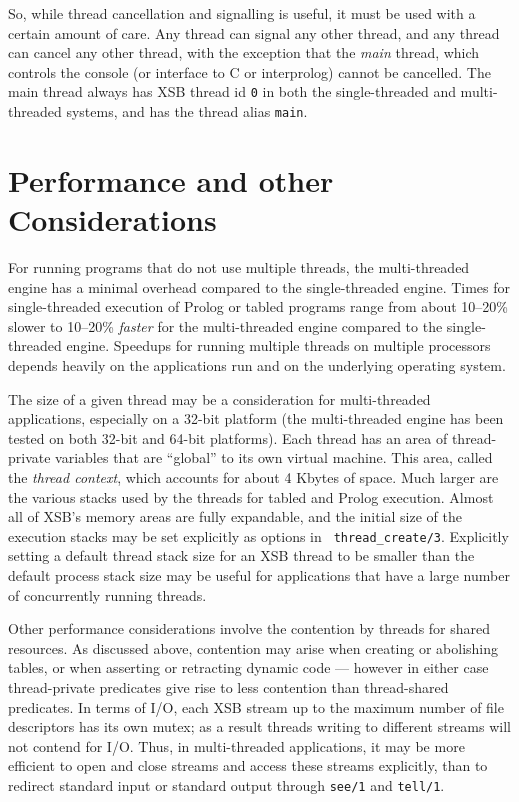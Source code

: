 So, while thread cancellation and signalling is useful, it must be
used with a certain amount of care.  Any thread can signal any other
thread, and any thread can cancel any other thread, with the exception
that the {\em main} thread, which controls the console (or interface
to C or interprolog) cannot be cancelled.  The main thread always has
XSB thread id {\tt 0} in both the single-threaded and multi-threaded
systems, and has the thread alias {\tt main}.

\section{Performance and other Considerations}
%
For running programs that do not use multiple threads, the
multi-threaded engine has a minimal overhead compared to the
single-threaded engine.  Times for single-threaded execution of Prolog
or tabled programs range from about 10--20\% slower to 10--20\% {\em
  faster} for the multi-threaded engine compared to the
single-threaded engine.  Speedups for running multiple threads on
multiple processors depends heavily on the applications run and on the
underlying operating system.

The size of a given thread may be a consideration for multi-threaded
applications, especially on a 32-bit platform (the multi-threaded
engine has been tested on both 32-bit and 64-bit platforms).  Each
thread has an area of thread-private variables that are ``global'' to
its own virtual machine.  This area, called the {\em thread context},
which accounts for about 4 Kbytes of space.  Much larger are the
various stacks used by the threads for tabled and Prolog execution.
Almost all of XSB's memory areas are fully expandable, and the initial
size of the execution stacks may be set explicitly as options in {\tt
  thread\_create/3}.  Explicitly setting a default thread stack size
for an XSB thread to be smaller than the default process stack size
may be useful for applications that have a large number of
concurrently running threads.

Other performance considerations involve the contention by threads for
shared resources.  As discussed above, contention may arise when
creating or abolishing tables, or when asserting or retracting dynamic
code --- however in either case thread-private predicates give rise to
less contention than thread-shared predicates.  In terms of I/O, each
XSB stream up to the maximum number of file descriptors has its own
mutex; as a result threads writing to different streams will not
contend for I/O.  Thus, in multi-threaded applications, it may be more
efficient to open and close streams and access these streams
explicitly, than to redirect standard input or standard output through
{\tt see/1} and {\tt tell/1}.

